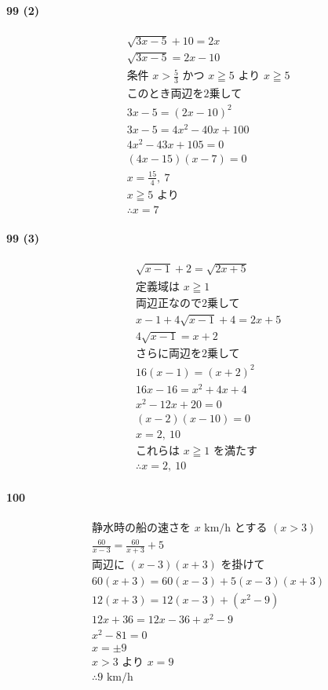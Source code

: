 \documentclass[fleqn,a4j,dvipdfmx,uplatex,twocolumn]{jsarticle}
\begin{document}
\paragraph{99 (2)}
\begin{align*}
  &\sqrt{3x-5}+10=2x \\
  &\sqrt{3x-5}=2x-10 \\
  &\text{条件 } x > \frac{5}{3} \text{ かつ } x \geqq 5 \text{ より } x \geqq 5 \\
  &\text{このとき両辺を2乗して} \\
  &3x-5 = (2x-10)^{2} \\
  &3x-5 = 4x^{2}-40x+100 \\
  &4x^{2}-43x+105=0 \\
  &(4x-15)(x-7)=0 \\
  &x = \frac{15}{4}, \ 7 \\
  &x \geqq 5 \text{ より } \\
  &\therefore x = 7
\end{align*}

\paragraph{99 (3)}
\begin{align*}
  &\sqrt{x-1}+2=\sqrt{2x+5} \\
  &\text{定義域は } x \geqq 1 \\
  &\text{両辺正なので2乗して} \\
  &x-1+4\sqrt{x-1}+4 = 2x+5 \\
  &4\sqrt{x-1} = x+2 \\
  &\text{さらに両辺を2乗して} \\
  &16(x-1) = (x+2)^{2} \\
  &16x-16 = x^{2}+4x+4 \\
  &x^{2}-12x+20=0 \\
  &(x-2)(x-10)=0 \\
  &x=2, \ 10 \\
  &\text{これらは } x \geqq 1 \text{ を満たす} \\
  &\therefore x=2, \ 10
\end{align*}

\paragraph{100}
\begin{align*}
  &\text{静水時の船の速さを } x \text{ km/h とする } (x > 3) \\
  &\frac{60}{x-3} = \frac{60}{x+3} + 5 \\
  &\text{両辺に } (x-3)(x+3) \text{ を掛けて} \\
  &60(x+3) = 60(x-3) + 5(x-3)(x+3) \\
  &12(x+3) = 12(x-3) + (x^{2}-9) \\
  &12x + 36 = 12x - 36 + x^{2} - 9 \\
  &x^{2} - 81 = 0 \\
  &x = \pm 9 \\
  &x > 3 \text{ より } x = 9 \\
  &\therefore 9 \text{ km/h}
\end{align*}
\end{document}
